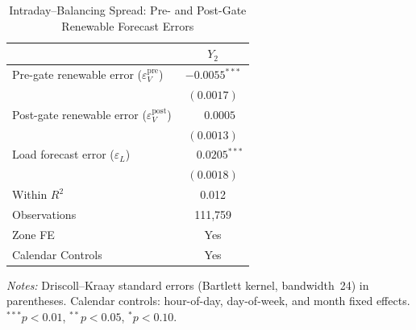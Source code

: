 \documentclass{article}
\begin{document}
\begin{table}[htbp]
\centering
\caption{Intraday--Balancing Spread: Pre- and Post-Gate Renewable Forecast Errors}
\label{tab:4}
\begin{threeparttable}
\begin{tabularx}{\linewidth}{>{\raggedright\arraybackslash}Xc}
\toprule
 & $Y_2$ \\
\midrule
Pre-gate renewable error ($\varepsilon_V^{\mathrm{pre}}$) & $-0.0055^{***}$ \\
 & $(0.0017)$ \\[0.4ex]
Post-gate renewable error ($\varepsilon_V^{\mathrm{post}}$) & $\phantom{-}0.0005$ \\
 & $(0.0013)$ \\[0.4ex]
Load forecast error ($\varepsilon_L$) & $\phantom{-}0.0205^{***}$ \\
 & $(0.0018)$ \\
\midrule
Within $R^2$ & 0.012 \\
Observations & 111,759 \\
Zone FE & Yes \\
Calendar Controls & Yes \\
\bottomrule
\end{tabularx}
\begin{tablenotes}[flushleft]
\footnotesize
\item \textit{Notes:} Driscoll--Kraay standard errors (Bartlett kernel, bandwidth~24) in parentheses. Calendar controls: hour-of-day, day-of-week, and month fixed effects. $^{***}p<0.01$, $^{**}p<0.05$, $^{*}p<0.10$.
\end{tablenotes}
\end{threeparttable}
\end{table}
\end{document}
